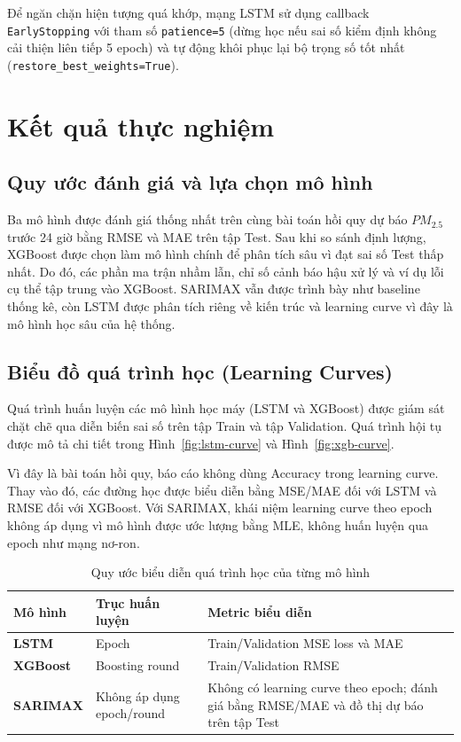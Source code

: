\documentclass[12pt,a4paper]{article}
\begin{document}
Để ngăn chặn hiện tượng quá khớp, mạng LSTM sử dụng callback \texttt{EarlyStopping} với tham số \texttt{patience=5} (dừng học nếu sai số kiểm định không cải thiện liên tiếp 5 epoch) và tự động khôi phục lại bộ trọng số tốt nhất (\texttt{restore\_best\_weights=True}).

\section{Kết quả thực nghiệm}

\subsection{Quy ước đánh giá và lựa chọn mô hình}

Ba mô hình được đánh giá thống nhất trên cùng bài toán hồi quy dự báo $PM_{2.5}$ trước 24 giờ bằng RMSE và MAE trên tập Test. Sau khi so sánh định lượng, XGBoost được chọn làm mô hình chính để phân tích sâu vì đạt sai số Test thấp nhất. Do đó, các phần ma trận nhầm lẫn, chỉ số cảnh báo hậu xử lý và ví dụ lỗi cụ thể tập trung vào XGBoost. SARIMAX vẫn được trình bày như baseline thống kê, còn LSTM được phân tích riêng về kiến trúc và learning curve vì đây là mô hình học sâu của hệ thống.

\subsection{Biểu đồ quá trình học (Learning Curves)}

Quá trình huấn luyện các mô hình học máy (LSTM và XGBoost) được giám sát chặt chẽ qua diễn biến sai số trên tập Train và tập Validation. Quá trình hội tụ được mô tả chi tiết trong Hình~\ref{fig:lstm-curve} và Hình~\ref{fig:xgb-curve}.

Vì đây là bài toán hồi quy, báo cáo không dùng Accuracy trong learning curve. Thay vào đó, các đường học được biểu diễn bằng MSE/MAE đối với LSTM và RMSE đối với XGBoost. Với SARIMAX, khái niệm learning curve theo epoch không áp dụng vì mô hình được ước lượng bằng MLE, không huấn luyện qua epoch như mạng nơ-ron.

\begin{table}[H]
    \centering
    \caption{Quy ước biểu diễn quá trình học của từng mô hình}
    \label{tab:learning-curve-availability}
    \begin{tabularx}{\textwidth}{l l >{\raggedright\arraybackslash}X}
        \toprule
        \textbf{Mô hình} & \textbf{Trục huấn luyện} & \textbf{Metric biểu diễn} \\
        \midrule
        \textbf{LSTM} & Epoch & Train/Validation MSE loss và MAE \\
        \textbf{XGBoost} & Boosting round & Train/Validation RMSE \\
        \textbf{SARIMAX} & Không áp dụng epoch/round & Không có learning curve theo epoch; đánh giá bằng RMSE/MAE và đồ thị dự báo trên tập Test \\
        \bottomrule
    \end{tabularx}
\end{table}
\end{document}
